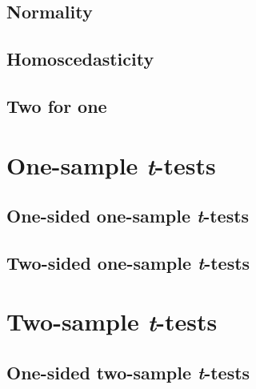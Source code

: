 \documentclass[english,10pt,a4paper,oneside]{book}
\begin{document}
\hypertarget{normality}{%
\subsection{Normality}\label{normality}}

\hypertarget{homoscedasticity}{%
\subsection{Homoscedasticity}\label{homoscedasticity}}

\hypertarget{two-for-one}{%
\subsection{Two for one}\label{two-for-one}}

\hypertarget{one-sample-t-tests}{%
\section{\texorpdfstring{One-sample \emph{t}-tests}{One-sample t-tests}}\label{one-sample-t-tests}}

\hypertarget{one-sided-one-sample-t-tests}{%
\subsection{\texorpdfstring{One-sided one-sample \emph{t}-tests}{One-sided one-sample t-tests}}\label{one-sided-one-sample-t-tests}}

\hypertarget{two-sided-one-sample-t-tests}{%
\subsection{\texorpdfstring{Two-sided one-sample \emph{t}-tests}{Two-sided one-sample t-tests}}\label{two-sided-one-sample-t-tests}}

\hypertarget{two-sample-t-tests}{%
\section{\texorpdfstring{Two-sample \emph{t}-tests}{Two-sample t-tests}}\label{two-sample-t-tests}}

\hypertarget{one-sided-two-sample-t-tests}{%
\subsection{\texorpdfstring{One-sided two-sample \emph{t}-tests}{One-sided two-sample t-tests}}\label{one-sided-two-sample-t-tests}}
\end{document}
